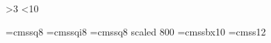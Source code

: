 \ifnum{}
  \@dst@in@oct@or@mar 
\else
  \ifnum\month>3
    \ifnum\month<10
      \dsttrue
    \else
      \ifnum{}
        \@dst@in@oct@or@mar
      \fi
    \fi
  \fi
\fi

\def\isotz{%
-\ifdst700\else800\fi} %

\def\isotime{\begingroup%
  \count0 = \time\divide\count0 by 60 %
  \count2 = \count0 %
  \count4 = \time\multiply\count0 by 60 %
  \advance\count4 by -\count0 %
  \pad@one@zero{\count2}:\pad@one@zero{\count4}:00\isotz %
\endgroup}

\def\isodatetime{\isodate T\isotime}

\def\@maketitleaddenda{\mbox{Compiled: {\tt\isodatetime}}}


\def\@journal[#1]#2{\emph{\frenchspacing#1}}
\def\@@journal#1{\@journal[#1]{}}
\def\journal{\@ifnextchar[\@journal\@@journal}
\def\volume{\textbf}

\font\eightss=cmssq8
\font\eightssi=cmssqi8
\font\sixss=cmssq8 scaled 800
\font\tenssbx=cmssbx10
\font\twelvess=cmss12


\def\chapterquotes{
  \baselineskip 10pt
  \parfillskip \z@
  \interlinepenalty 10000
  \leftskip \z@ plus 40pc minus \parindent
  \let\rm=\eightss \let\sl=\eightssi \let\adbcfont=\sixss \let\em=\sl
  \everypar{\sl}
  \def\from{\par\nobreak\smallskip\noindent\rm--- }
  \def\author##1(##2){\from ##1\unskip\enspace(##2)}
  \def\\{\hskip.05em} %
  \obeylines}
\def\endchapterquotes{}




\def\thetheorem{\thesection.\arabic{theorem}}

\newif\ifearmuffed\earmuffedfalse
\def\earmuffed{\earmuffedtrue}

